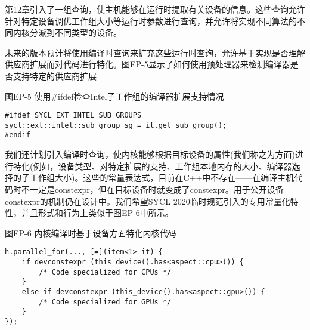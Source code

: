 第12章引入了一组查询，使主机能够在运行时提取有关设备的信息。这些查询允许针对特定设备调优工作组大小等运行时参数进行查询，并允许将实现不同算法的不同内核分派到不同类型的设备。\par

未来的版本预计将使用编译时查询来扩充这些运行时查询，允许基于实现是否理解供应商扩展而对代码进行特化。图EP-5显示了如何使用预处理器来检测编译器是否支持特定的供应商扩展\par

\hspace*{\fill} \par %
图EP-5 使用\#ifdef检查Intel子工作组的编译器扩展支持情况
\begin{lstlisting}[caption={}]
#ifdef SYCL_EXT_INTEL_SUB_GROUPS
sycl::ext::intel::sub_group sg = it.get_sub_group();
#endif
\end{lstlisting}

我们还计划引入编译时查询，使内核能够根据目标设备的属性(我们称之为方面)进行特化(例如，设备类型、对特定扩展的支持、工作组本地内存的大小、编译器选择的子工作组大小)。这些的常量表达式，目前在C++中不存在——在编译主机代码时不一定是constexpr，但在目标设备时就变成了constexpr。用于公开设备constexpr的机制仍在设计中。我们希望SYCL 2020临时规范引入的专用常量化特性，并且形式和行为上类似于图EP-6中所示。\par

\hspace*{\fill} \par %
图EP-6 内核编译时基于设备方面特化内核代码
\begin{lstlisting}[caption={}]
h.parallel_for(..., [=](item<1> it) {
	if devconstexpr (this_device().has<aspect::cpu>()) {
		/* Code specialized for CPUs */
	}
	else if devconstexpr (this_device().has<aspect::gpu>()) {
		/* Code specialized for GPUs */
	}
});
\end{lstlisting}






















































